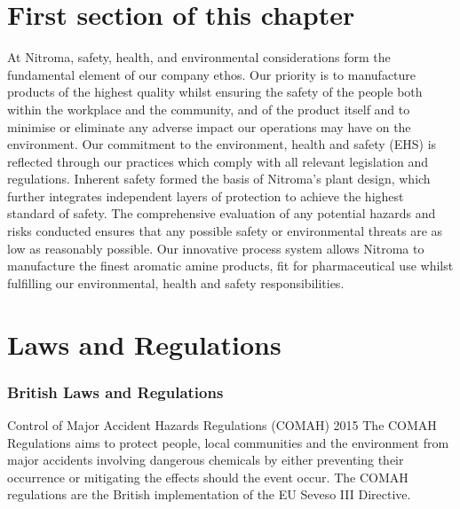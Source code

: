 \section{First section of this chapter}

At Nitroma, safety, health, and environmental considerations form the fundamental element of our company ethos. Our priority is to manufacture products of the highest quality whilst ensuring the safety of the people both within the workplace and the community, and of the product itself and to minimise or eliminate any adverse impact our operations may have on the environment. Our commitment to the environment, health and safety (EHS) is reflected through our practices which comply with all relevant legislation and regulations. Inherent safety formed the basis of Nitroma’s plant design, which further integrates independent layers of protection to achieve the highest standard of safety. The comprehensive evaluation of any potential hazards and risks conducted ensures that any possible safety or environmental threats are as low as reasonably possible. Our innovative process system allows Nitroma to manufacture the finest aromatic amine products, fit for pharmaceutical use whilst fulfilling our environmental, health and safety responsibilities.

\section{Laws and Regulations}

\subsubsection{British Laws and Regulations}
Control of Major Accident Hazards Regulations (COMAH) 2015
The COMAH Regulations aims to protect people, local communities and the environment from major accidents involving dangerous chemicals by either preventing their occurrence or mitigating the effects should the event occur. The COMAH regulations are the British implementation of the EU Seveso III Directive. 

